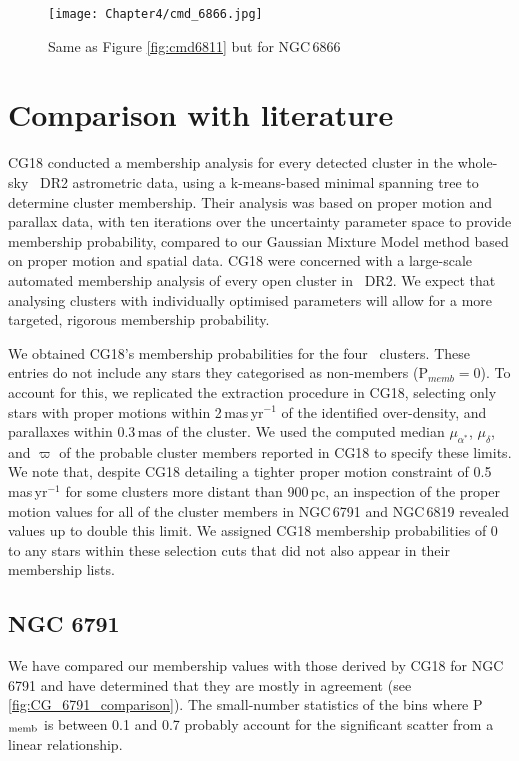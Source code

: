 \begin{figure}[hbtp]
\centering
\texttt{[image: Chapter4/cmd\_6866.jpg]}
\caption[NGC\,6866 CMD]{Same as Figure \ref{fig:cmd6811} but for NGC\,6866}
\label{fig:cmd6866}
\end{figure} %
\newpage

\section{Comparison with literature}

CG18 conducted a membership analysis for every detected cluster in the whole-sky \Gaia~DR2 astrometric data, using a k-means-based minimal spanning tree to determine cluster membership. Their analysis was based on proper motion and parallax data, with ten iterations over the uncertainty parameter space to provide membership probability, compared to our Gaussian Mixture Model method based on proper motion and spatial data. CG18 were concerned with a large-scale automated membership analysis of every open cluster in \Gaia~DR2. We expect that analysing clusters with individually optimised parameters will allow for a more targeted, rigorous membership probability.

We obtained CG18's membership probabilities for the four \Kepler~clusters. These entries do not include any stars they categorised as non-members (P$_{memb} = 0$). To account for this, we replicated the extraction procedure in CG18, selecting only stars with proper motions within 2\,mas\,yr$^{-1}$ of the identified over-density, and parallaxes within 0.3\,mas of the cluster. We used the computed median $\mu_{\alpha^{*}}$, $\mu_{\delta}$, and $\varpi$ of the probable cluster members reported in CG18 to specify these limits. We note that, despite CG18 detailing a tighter proper motion constraint of 0.5\,mas\,yr$^{-1}$ for some clusters more distant than 900\,pc, an inspection of the proper motion values for all of the cluster members in NGC\,6791 and NGC\,6819 revealed values up to double this limit. We assigned CG18 membership probabilities of 0 to any stars within these selection cuts that did not also appear in their membership lists.

\subsection{NGC 6791}

We have compared our membership values with those derived by CG18 for NGC\,6791 and have determined that they are mostly in agreement (see \cref{fig:CG_6791_comparison}). The small-number statistics of the bins where P$_{\rm memb}$ is between 0.1 and 0.7 probably account for the significant scatter from a linear relationship.

